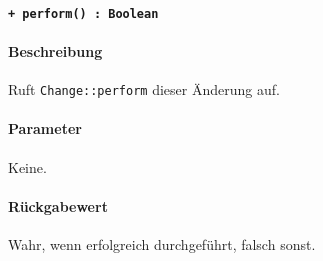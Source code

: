 \paragraph{\texttt{+ perform() : Boolean}}\label{AP_ChangeAction_perform}%
\paragraph*{Beschreibung}
Ruft \verb#Change::perform# dieser Änderung auf.
\paragraph*{Parameter}
Keine.
\paragraph*{Rückgabewert}
Wahr, wenn erfolgreich durchgeführt, falsch sonst.